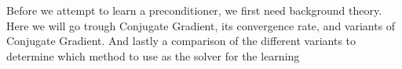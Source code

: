     Before we attempt to learn a preconditioner, we first need background theory. Here we will go trough Conjugate Gradient, its convergence rate, and variants of Conjugate Gradient. And lastly a comparison of the different variants to determine which method to use as the solver for the learning




